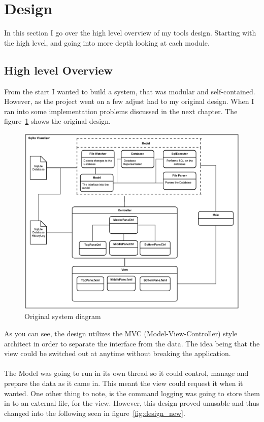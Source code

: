 \section{Design}
\label{sec:design}

In this section I go over the high level overview of my tools design. Starting with the high level, and going into more depth looking at each module.

\subsection{High level Overview}
\label{subsec:high_level_overview}

From the start I wanted to build a system, that was modular and self-contained. However, as the project went on a few adjust had to my original design. When I ran into some implementation problems discussed in the next chapter. The figure~\ref{fig:design_old} shows the original design.

\begin{figure}[H]
	\centering
	\includegraphics[scale=0.2]{images/system_diagram_old.png}
	\caption{Original system diagram}
	\label{fig:design_old}
\end{figure}

As you can see, the design utilizes the MVC (Model-View-Controller) style architect in order to separate the interface from the data. The idea being that the view could be switched out at anytime without breaking the application.
\\\\
The Model was going to run in its own thread so it could control, manage and prepare the data as it came in. This meant the view could request it when it wanted. One other thing to note, is the command logging was going to store them in to an external file, for the view. However, this design proved unusable and thus changed into the following seen in figure~\ref{fig:design_new}. 

